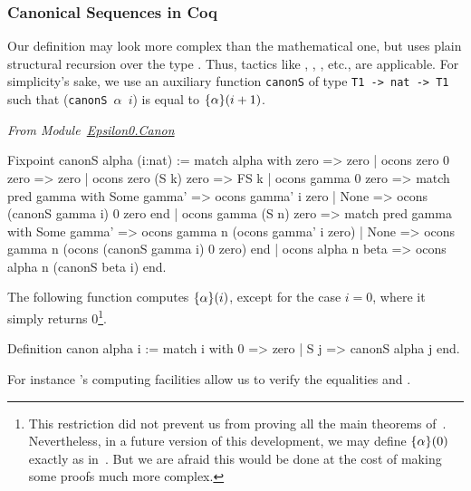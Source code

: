 \subsubsection{Canonical Sequences in Coq}

Our definition may look more complex than the mathematical one, but
uses plain structural recursion over the type . Thus, tactics like
, , , etc., are applicable. For simplicity's sake, 
we use an auxiliary function \texttt{canonS} of type \texttt{T1 -> nat  -> T1} such that
(\texttt{canonS  $\alpha$ $i$}) is equal to $\mbox{$\{\alpha\}(i+1)$}$.

\vspace{4pt}
\emph{From Module~\href{../theories/html/hydras.Epsilon0.Canon.html\#canonS}{Epsilon0.Canon}}

\label{Functions:canonS}
\label{Functions:canon}
\begin{Coqsrc}
Fixpoint canonS alpha (i:nat) :=
  match alpha with
      zero => zero
    | ocons zero 0 zero => zero
    | ocons zero (S k) zero => FS k
    | ocons gamma 0 zero =>
      match pred gamma with
          Some gamma' => ocons gamma' i zero
        | None => ocons (canonS gamma i) 0 zero
      end
    | ocons gamma (S n) zero =>
       match pred gamma with
           Some gamma' => ocons gamma n (ocons gamma' i zero)
         | None => ocons gamma n (ocons (canonS gamma i) 0 zero)
       end
    | ocons alpha n beta => ocons alpha n (canonS beta i)
  end.
\end{Coqsrc}


The following function computes $\mbox{$\{\alpha\}(i)$}$, except for the case $i=0$, where it simply returns $0$\;\footnote{This restriction did not prevent us from proving all the main theorems of~\cite{KS81, KP82}. Nevertheless, in a future version of this development, we may define $\mbox{$\{\alpha\}(0)$}$ exactly as 
in~\cite{KS81}. But we are afraid this would  be done at the cost of making some proofs much more complex.}.

\begin{Coqsrc}
 Definition canon alpha i := 
   match i with 0 => zero | S j => canonS alpha j end. 
\end{Coqsrc}

For instance \coq's computing facilities allow us to verify the equalities\linebreak 
{} and
.



